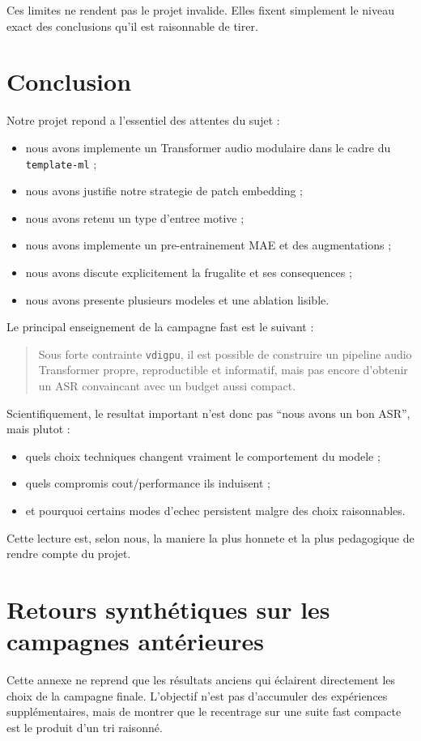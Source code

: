 \documentclass[11pt,a4paper]{article}
\begin{document}
Ces limites ne rendent pas le projet invalide. Elles fixent simplement le niveau exact des conclusions qu'il est raisonnable de tirer.

\section{Conclusion}
Notre projet repond a l'essentiel des attentes du sujet :
\begin{itemize}[leftmargin=1.2cm]
\item nous avons implemente un Transformer audio modulaire dans le cadre du \texttt{template-ml} ;
\item nous avons justifie notre strategie de patch embedding ;
\item nous avons retenu un type d'entree motive ;
\item nous avons implemente un pre-entrainement MAE et des augmentations ;
\item nous avons discute explicitement la frugalite et ses consequences ;
\item nous avons presente plusieurs modeles et une ablation lisible.
\end{itemize}

Le principal enseignement de la campagne fast est le suivant :
\begin{quote}
Sous forte contrainte \texttt{vdigpu}, il est possible de construire un pipeline audio Transformer propre, reproductible et informatif, mais pas encore d'obtenir un ASR convaincant avec un budget aussi compact.
\end{quote}

Scientifiquement, le resultat important n'est donc pas ``nous avons un bon ASR'', mais plutot :
\begin{itemize}[leftmargin=1.2cm]
\item quels choix techniques changent vraiment le comportement du modele ;
\item quels compromis cout/performance ils induisent ;
\item et pourquoi certains modes d'echec persistent malgre des choix raisonnables.
\end{itemize}

Cette lecture est, selon nous, la maniere la plus honnete et la plus pedagogique de rendre compte du projet.

\appendix
\section{Retours synth\'etiques sur les campagnes ant\'erieures}
Cette annexe ne reprend que les r\'esultats anciens qui \'eclairent directement les choix de la campagne finale. L'objectif n'est pas d'accumuler des exp\'eriences suppl\'ementaires, mais de montrer que le recentrage sur une suite fast compacte est le produit d'un tri raisonn\'e.
\end{document}
